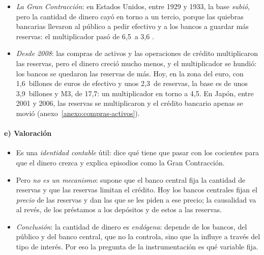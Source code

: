 \documentclass[11pt]{article}
\begin{document}
\begin{itemize}
\item \emph{La Gran Contracción}: en Estados Unidos, entre 1929 y 1933, la base \emph{subió}, pero la cantidad de dinero cayó en torno a un tercio, porque las quiebras bancarias llevaron al público a pedir efectivo y a los bancos a guardar más reservas: el multiplicador pasó de 6,5~a 3,6\nocite{FriedmanSchwartz1963Monetary} .
\item \emph{Desde 2008}: las compras de activos y las operaciones de crédito multiplicaron las reservas, pero el dinero creció mucho menos, y el multiplicador se hundió: los bancos se quedaron las reservas de más. Hoy, en la zona del euro, con 1,6~billones de euros de efectivo y unos 2,3~de reservas, la base es de unos 3,9~billones y M3, de 17,7: un multiplicador en torno a 4,5\nocite{BCE2026BSI,BCE2026ILM,BieberLizarazo2026Liquidez}. En Japón, entre 2001 y 2006, las reservas se multiplicaron y el crédito bancario apenas se movió\nocite{BowmanEtAl2015Quantitative} (anexo~\ref{anexo:compras-activos}).
\end{itemize}

\paragraph{e) Valoración}

\begin{itemize}
\item Es una \emph{identidad contable} útil: dice qué tiene que pasar con los cocientes para que el dinero crezca y explica episodios como la Gran Contracción.
\item Pero \emph{no es un mecanismo}: supone que el banco central fija la cantidad de reservas y que las reservas limitan el crédito. Hoy los bancos centrales fijan el \emph{precio} de las reservas y dan las que se les piden a ese precio; la causalidad va al revés, de los préstamos a los depósitos y de estos a las reservas\nocite{McLeayRadiaThomas2014Money}.
\item \emph{Conclusión}: la cantidad de dinero es \emph{endógena}: depende de los bancos, del público y del banco central, que no la controla, sino que la influye a través del tipo de interés. Por eso la pregunta de la instrumentación es qué variable fija.
\end{itemize}
\end{document}
